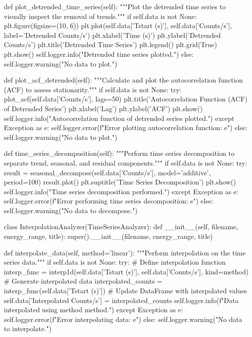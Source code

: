 \documentclass[nofootinbib,aps]{revtex4}
\begin{document}
\begin{framed}
\begin{pythoncode}[caption={main.py code}]
    def plot_detrended_time_series(self):
        """Plot the detrended time series to visually inspect the removal of trends."""
        if self.data is not None:
            plt.figure(figsize=(10, 6))
            plt.plot(self.data['Tstart (s)'], self.data['Counts/s'], label='Detrended Counts/s')
            plt.xlabel('Time (s)')
            plt.ylabel('Detrended Counts/s')
            plt.title('Detrended Time Series')
            plt.legend()
            plt.grid(True)
            plt.show()
            self.logger.info("Detrended time series plotted.")
        else:
            self.logger.warning("No data to plot.")

    def plot_acf_detrended(self):
        """Calculate and plot the autocorrelation function (ACF) to assess stationarity."""
        if self.data is not None:
            try:
                plot_acf(self.data['Counts/s'], lags=50)
                plt.title('Autocorrelation Function (ACF) of Detrended Series')
                plt.xlabel('Lag')
                plt.ylabel('ACF')
                plt.show()
                self.logger.info("Autocorrelation function of detrended series plotted.")
            except Exception as e:
                self.logger.error(f"Error plotting autocorrelation function: {e}")
        else:
            self.logger.warning("No data to plot.")

    def time_series_decomposition(self):
        """Perform time series decomposition to separate trend, seasonal, and residual components."""
        if self.data is not None:
            try:
                result = seasonal_decompose(self.data['Counts/s'], model='additive', period=100)
                result.plot()
                plt.suptitle('Time Series Decomposition')
                plt.show()
                self.logger.info("Time series decomposition performed.")
            except Exception as e:
                self.logger.error(f"Error performing time series decomposition: {e}")
        else:
            self.logger.warning("No data to decompose.")

class InterpolationAnalyzer(TimeSeriesAnalyzer):
    def __init__(self, filename, energy_range, title):
        super().__init__(filename, energy_range, title)

    def interpolate_data(self, method='linear'):
        """Perform interpolation on the time series data."""
        if self.data is not None:
            try:
                # Define interpolation function
                interp_func = interp1d(self.data['Tstart (s)'], self.data['Counts/s'], kind=method)
                # Generate interpolated data
                interpolated_counts = interp_func(self.data['Tstart (s)'])
                # Update DataFrame with interpolated values
                self.data['Interpolated Counts/s'] = interpolated_counts
                self.logger.info(f"Data interpolated using {method} method.")
            except Exception as e:
                self.logger.error(f"Error interpolating data: {e}")
        else:
            self.logger.warning("No data to interpolate.")


\end{pythoncode}
\end{framed}
\end{document}

